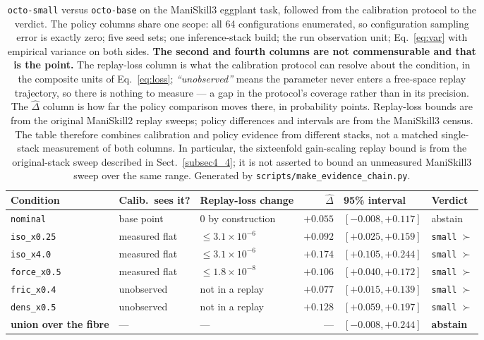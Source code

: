 \documentclass[pdflatex,iicol,sn-apa]{sn-jnl}
\theoremstyle{remark}
\begin{document}
\begin{table}[t]
\caption{\texttt{octo-small} versus \texttt{octo-base} on the ManiSkill3 eggplant task, followed
from the calibration protocol to the verdict. The policy columns share one scope: all 64 configurations
enumerated, so configuration sampling error is exactly zero; five seed sets; one inference-stack
build; the run observation unit; Eq.~\eqref{eq:var} with empirical variance on both sides.
\textbf{The second and fourth columns are not commensurable and that is the point.} The replay-loss
column is what the calibration protocol can resolve about the condition, in the composite units of
Eq.~\eqref{eq:loss}; \emph{``unobserved''} means the parameter never enters a free-space replay
trajectory, so there is nothing to measure --- a gap in the protocol's coverage rather than in its
precision. The $\hat\Delta$ column is how far the policy comparison moves there, in probability
points. Replay-loss bounds are from the original ManiSkill2 replay sweeps; policy differences and
intervals are from the ManiSkill3 census. The table therefore combines calibration and policy
evidence from different stacks, not a matched single-stack measurement of both columns. In
particular, the sixteenfold gain-scaling replay bound is from the original-stack sweep described in
Sect.~\ref{subsec4_4}; it is not asserted to bound an unmeasured ManiSkill3 sweep over the same range.
Generated by \texttt{scripts/make\_evidence\_chain.py}.}\label{tab6a}
\small
\begin{tabular}{@{}lllrll@{}}
\toprule
Condition & Calib.\ sees it? & Replay-loss change & $\hat\Delta$ & 95\% interval & Verdict \\
\midrule
\texttt{nominal} & base point & $0$ by construction & $+0.055$ & $[-0.008, +0.117]$ & abstain \\
\texttt{iso\_x0.25} & measured flat & $\le 3.1\times10^{-6}$ & $+0.092$ & $[+0.025, +0.159]$ & \texttt{small} $\succ$ \\
\texttt{iso\_x4.0} & measured flat & $\le 3.1\times10^{-6}$ & $+0.174$ & $[+0.105, +0.244]$ & \texttt{small} $\succ$ \\
\texttt{force\_x0.5} & measured flat & $\le 1.8\times10^{-8}$ & $+0.106$ & $[+0.040, +0.172]$ & \texttt{small} $\succ$ \\
\texttt{fric\_x0.4} & unobserved & not in a replay & $+0.077$ & $[+0.015, +0.139]$ & \texttt{small} $\succ$ \\
\texttt{dens\_x0.5} & unobserved & not in a replay & $+0.128$ & $[+0.059, +0.197]$ & \texttt{small} $\succ$ \\
\midrule
\textbf{union over the fibre} & --- & --- & --- & $\mathbf{[-0.008, +0.244]}$ & \textbf{abstain} \\
\bottomrule
\end{tabular}
\end{table}
\end{document}
